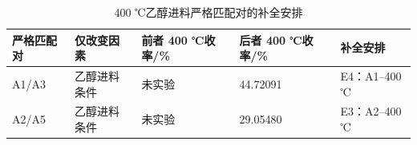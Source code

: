 \begin{table}[H]
  \centering
  \caption{400 ℃乙醇进料严格匹配对的补全安排}
  \label{tab:q4-feed-pairs}
  \small
  \begin{tabularx}{\textwidth}{C{0.15\textwidth}C{0.17\textwidth}C{0.18\textwidth}C{0.18\textwidth}C{0.18\textwidth}}
    \toprule
    严格匹配对 & 仅改变因素 & 前者 400 ℃收率/\% & 后者 400 ℃收率/\% & 补全安排 \\
    \midrule
    A1/A3 & 乙醇进料条件 & 未实验 & 44.72091 & E4：A1--400 ℃ \\
    A2/A5 & 乙醇进料条件 & 未实验 & 29.05480 & E3：A2--400 ℃ \\
    \bottomrule
  \end{tabularx}
\end{table}
